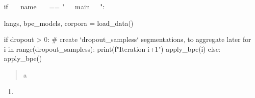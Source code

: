 \begin{python}


if __name__ == "__main__":

    langs, bpe_models, corpora = load_data()

    if dropout > 0:
        # create `dropout_sampless` segmentations, to aggregate later
        for i in range(dropout_sampless):
            print(f"Iteration {i+1}")
            apply_bpe(i)
    else:
        apply_bpe()
\end{python}




\begin{python}

\end{python}

\begin{quote}
	a\\
\end{quote}

\begin{enumerate}
	\item 
\end{enumerate}